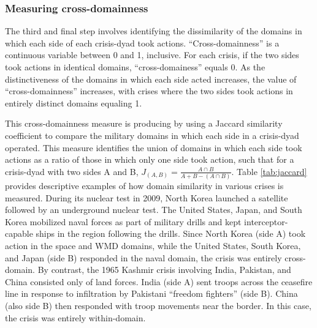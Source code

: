 \documentclass[
]{article}
\begin{document}
\hypertarget{measuring-cross-domainness}{%
\subsubsection{Measuring cross-domainness}\label{measuring-cross-domainness}}

The third and final step involves identifying the dissimilarity of the domains in which each side of each crisis-dyad took actions. ``Cross-domainness'' is a continuous variable between 0 and 1, inclusive. For each crisis, if the two sides took actions in identical domains, ``cross-domainess'' equals 0. As the distinctiveness of the domains in which each side acted increases, the value of ``cross-domainness'' increases, with crises where the two sides took actions in entirely distinct domains equaling 1.

This cross-domainness measure is producing by using a Jaccard similarity coefficient to compare the military domains in which each side in a crisis-dyad operated. This measure identifies the union of domains in which each side took actions as a ratio of those in which only one side took action, such that for a crisis-dyad with two sides A and B, \(J_{(A, B)} = \frac{A \cap B}{A + B - (A \cap B)}\). Table \ref{tab:jaccard} provides descriptive examples of how domain similarity in various crises is measured. During its nuclear test in 2009, North Korea launched a satellite followed by an underground nuclear test. The United States, Japan, and South Korea mobilized naval forces as part of military drills and kept interceptor-capable ships in the region following the drills. Since North Korea (side A) took action in the space and WMD domains, while the United States, South Korea, and Japan (side B) responded in the naval domain, the crisis was entirely cross-domain. By contrast, the 1965 Kashmir crisis involving India, Pakistan, and China consisted only of land forces. India (side A) sent troops across the ceasefire line in response to infiltration by Pakistani ``freedom fighters'' (side B). China (also side B) then responded with troop movements near the border. In this case, the crisis was entirely within-domain.
\end{document}
